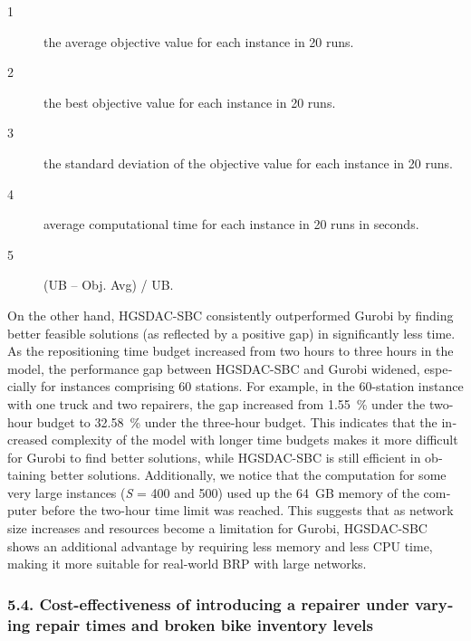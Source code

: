 \documentclass[
  english,
]{article}
\begin{document}
\begin{otherlanguage}{english}
\begin{description}
\item[1]
\protect{}\label{np100}
the average objective value for each instance in 20 runs.
\item[2]
\protect{}\label{np105}
the best objective value for each instance in 20 runs.
\item[3]
\protect{}\label{np110}
the standard deviation of the objective value for each instance in 20 runs.
\item[4]
\protect{}\label{np115}
average computational time for each instance in 20 runs in seconds.
\item[5]
\protect{}\label{np120}
(UB -- Obj. Avg) / UB.
\end{description}

\protect{}\label{p0660}
On the other hand, HGSDAC-SBC consistently outperformed Gurobi by finding better feasible solutions
(as reflected by a positive gap) in significantly less time. As the repositioning time budget
increased from two hours to three hours in the model, the performance gap between HGSDAC-SBC and
Gurobi widened, especially for instances comprising 60 stations. For example, in the 60-station
instance with one truck and two repairers, the gap increased from 1.55~\% under the two-hour budget
to 32.58~\% under the three-hour budget. This indicates that the increased complexity of the model
with longer time budgets makes it more difficult for Gurobi to find better solutions, while
HGSDAC-SBC is still efficient in obtaining better solutions. Additionally, we notice that the
computation for some very large instances (\textbar{}\emph{S}\textbar{} = 400 and 500) used up the
64~GB memory of the computer before the two-hour time limit was reached. This suggests that as
network size increases and resources become a limitation for Gurobi, HGSDAC-SBC shows an additional
advantage by requiring less memory and less CPU time, making it more suitable for real-world BRP
with large networks.

\protect{}\label{s0125}
\subsubsection{5.4. Cost-effectiveness of introducing a repairer under varying repair times and
broken bike inventory levels}\label{st145}


\end{otherlanguage}
\end{document}
